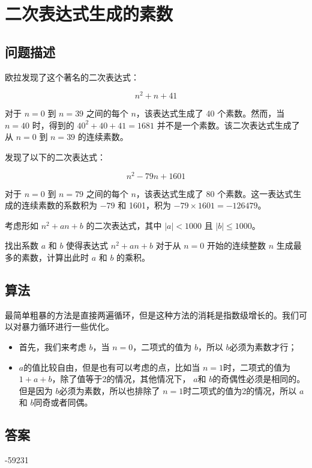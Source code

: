 \section{二次表达式生成的素数}
\subsection{问题描述}
\begin{tcolorbox}
欧拉发现了这个著名的二次表达式：

\[
n^2 + n + 41
\]

对于 \( n = 0 \) 到 \( n = 39 \) 之间的每个 \( n \)，该表达式生成了 40 个素数。然而，当 \( n = 40 \) 时，得到的 \( 40^2 + 40 + 41 = 1681 \) 并不是一个素数。该二次表达式生成了从 \( n = 0 \) 到 \( n = 39 \) 的连续素数。

发现了以下的二次表达式：

\[
n^2 - 79n + 1601
\]

对于 \( n = 0 \) 到 \( n = 79 \) 之间的每个 \( n \)，该表达式生成了 80 个素数。这一表达式生成的连续素数的系数积为 \( -79 \) 和 1601，积为 \( -79 \times 1601 = -126479 \)。

考虑形如 \( n^2 + an + b \) 的二次表达式，其中 \( |a| < 1000 \) 且 \( |b| \leq 1000 \)。

找出系数 \( a \) 和 \( b \) 使得表达式 \( n^2 + an + b \) 对于从 \( n = 0 \) 开始的连续整数 \( n \) 生成最多的素数，计算出此时 \( a \) 和 \( b \) 的乘积。

\end{tcolorbox}

\subsection{算法}
最简单粗暴的方法是直接两遍循环，但是这种方法的消耗是指数级增长的。我们可以对暴力循环进行一些优化。

\begin{itemize}
  \item 首先，我们来考虑 \( b \)，当 \( n = 0 \)，二项式的值为 \( b \)，所以 \( b \)必须为素数才行；
  \item \( a \)的值比较自由，但是也有可以考虑的点，比如当 \( n = 1 \)时，二项式的值为 \( 1 + a + b
    \)，除了值等于2的情况，其他情况下， \( a \)和 \( b \)的奇偶性必须是相同的。但是因为 \( b \)必须为素数，所以也排除了
    \( n = 1 \)时二项式的值为2的情况，所以 \( a \)和 \( b \)同奇或者同偶。
\end{itemize}

\subsection{答案}
-59231
